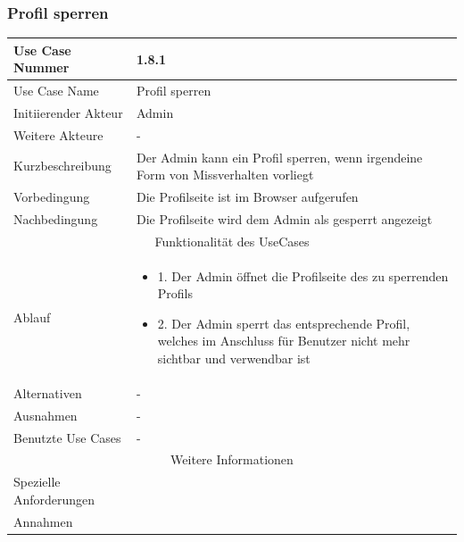 \documentclass[10pt,a4paper]{article}
\begin{document}
			\subsubsection{Profil sperren}
		\begin{tabular}{|l|p{.5\linewidth}|}
		\hline Use Case Nummer & 1.8.1 \\ 
		\hline Use Case Name & Profil sperren \\ 
		\hline Initiierender Akteur & Admin \\
		\hline Weitere Akteure & - \\
		\hline Kurzbeschreibung & Der Admin kann ein Profil sperren, wenn irgendeine Form von Missverhalten vorliegt \\
		\hline Vorbedingung & Die Profilseite ist im Browser aufgerufen \\
		\hline Nachbedingung & Die Profilseite wird dem Admin als gesperrt angezeigt \\
		\hline \multicolumn{2}{|c|}{Funktionalität des UseCases}\\
		\hline Ablauf & \begin{itemize}
					\item 1. Der Admin \"offnet die Profilseite des zu sperrenden Profils
					\item 2. Der Admin sperrt das entsprechende Profil, welches im Anschluss f\"ur Benutzer nicht mehr sichtbar und verwendbar ist
				\end{itemize}\\
		\hline Alternativen & - \\
		\hline Ausnahmen & - \\
		\hline Benutzte Use Cases & - \\
		\hline \multicolumn{2}{|c|}{Weitere Informationen} \\
		\hline Spezielle Anforderungen &  \\
		\hline Annahmen &  \\
		\hline
		\end{tabular}
		
\end{document}
